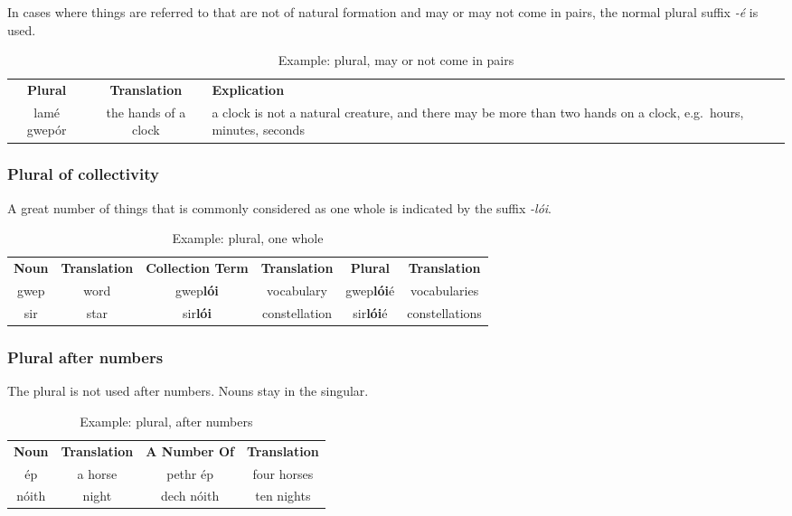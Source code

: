 In cases where things are referred to that are not of natural formation and may or may not come in pairs, the normal plural suffix \textit{-\'{e}} is used.
\begin{table}[H]
\centering
\begin{tabular}{ccM{10.0cm}}
  \toprule
  \textbf{Plural} & \textbf{Translation} & \textbf{Explication}\\
  \cmidrule(lr){1-1}\cmidrule(lr){2-2}\cmidrule(lr){3-3}
  lam\'{e} gwep\'{o}r & the hands of a clock & a clock is not a natural creature, and there may be more than two hands on a clock, e.g.\ hours, minutes, seconds\\
  \bottomrule
\end{tabular}
\caption{Example: plural, may or not come in pairs}
\label{example_plural_may_or_not}
\end{table}

\subsubsection{Plural of collectivity}

A great number of things that is commonly considered as one whole is indicated by the suffix \textit{-l\'{o}i}.
\begin{table}[H]
\centering
\begin{tabular}{cccccc}
  \toprule
  \textbf{Noun} & \textbf{Translation} & \textbf{Collection Term} & \textbf{Translation} & \textbf{Plural} & \textbf{Translation}\\
  \cmidrule(lr){1-1}\cmidrule(lr){2-2}\cmidrule(lr){3-3}\cmidrule(lr){4-4}\cmidrule(lr){5-5}\cmidrule(lr){6-6}
  gwep & word & gwep\textbf{l\'{o}i} & vocabulary & gwep\textbf{l\'{o}i}\'{e} & vocabularies\\
  sir & star & sir\textbf{l\'{o}i} & constellation & sir\textbf{l\'{o}i}\'{e} & constellations\\
  \bottomrule
\end{tabular}
\caption{Example: plural, one whole}
\label{example_plural_one_whole}
\end{table}

\subsubsection{Plural after numbers}

The plural is not used after numbers. Nouns stay in the singular.
\begin{table}[H]
\centering
\begin{tabular}{cccc}
  \toprule
  \textbf{Noun} & \textbf{Translation} & \textbf{A Number Of} & \textbf{Translation}\\
  \cmidrule(lr){1-1}\cmidrule(lr){2-2}\cmidrule(lr){3-3}\cmidrule(lr){4-4}
  \'{e}p & a horse & pethr \'{e}p & four horses\\
  n\'{o}ith & night & dech n\'{o}ith & ten nights\\
  \bottomrule
\end{tabular}
\caption{Example: plural, after numbers}
\label{example_plural_after_numbers}
\end{table}

